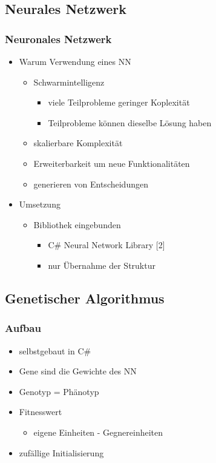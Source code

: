 \documentclass[compress]{beamer}
\begin{document}
\subsection{Neurales Netzwerk}

\begin{frame}
	\frametitle{Neuronales Netzwerk}

	\begin{itemize}
		\item Warum Verwendung eines NN
		\begin{itemize}
			\item Schwarmintelligenz
			\begin{itemize}
				\item viele Teilprobleme geringer Koplexität
				\item Teilprobleme können dieselbe Lösung haben
			\end{itemize}
			\item skalierbare Komplexität
			\item Erweiterbarkeit um neue Funktionalitäten
			\item generieren von Entscheidungen
		\end{itemize}
		\item Umsetzung
		\begin{itemize}
			\item Bibliothek eingebunden
			\begin{itemize}
				\item C\# Neural Network Library [2]
				\item nur Übernahme der Struktur
			\end{itemize}
		\end{itemize}	
	\end{itemize}
\end{frame}

\subsection{Genetischer Algorithmus}

\begin{frame}
	\frametitle{Aufbau}

	\begin{itemize}
		\item selbstgebaut in C\#
		\item Gene sind die Gewichte des NN
		\item Genotyp = Phänotyp		
		\item Fitnesswert
		\begin{itemize}
			\item eigene Einheiten - Gegnereinheiten
		\end{itemize}
		\item zufällige Initialisierung
	\end{itemize}
\end{frame}
\end{document}
